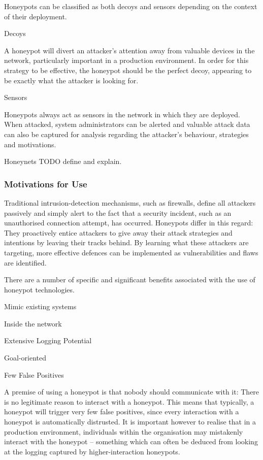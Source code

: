 Honeypots can be classified as both decoys and sensors depending on the context of their deployment.

\bullet Decoys

A honeypot will divert an attacker’s attention away from valuable devices in the network,
particularly important in a production environment. In order for this strategy to be effective, the honeypot should be the perfect decoy, appearing to be exactly what the attacker is looking for.

\bullet Sensors

Honeypots always act as sensors in the network in which they are deployed. When attacked, system administrators can be alerted and valuable attack data can also be captured for analysis regarding the attacker’s behaviour, strategies and motivations.

Honeynets TODO define and explain.

\subsubsection{Motivations for Use}
Traditional intrusion-detection mechanisms, such as firewalls, define all attackers passively and
simply alert to the fact that a security incident, such as an unauthorised connection attempt, has occurred. Honeypots differ in this regard: They proactively entice attackers to give away their attack strategies and intentions by leaving their tracks behind. By learning what these attackers are targeting, more effective defences can be implemented as vulnerabilities and flaws are identified.

There are a number of specific and significant benefits associated with the use of honeypot
technologies.

\bullet Mimic existing systems

\bullet Inside the network

\bullet Extensive Logging Potential

\bullet Goal-oriented

\bullet Few False Positives

A premise of using a honeypot is that nobody should communicate with it: There is no legitimate reason to interact with a honeypot. This means that typically, a honeypot will trigger very few false positives, since every interaction with a honeypot is automatically distrusted. It is important however to realise that in a production environment, individuals within the organisation may mistakenly interact with the honeypot – something which can often be deduced from looking at the logging captured by higher-interaction honeypots. 

